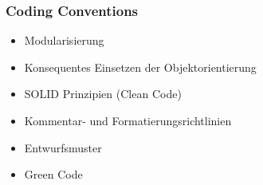 \begin{frame}
\frametitle{Coding Conventions}

\begin{itemize}
\item Modularisierung
\item Konsequentes Einsetzen der Objektorientierung
\item SOLID Prinzipien (Clean Code)
\item Kommentar- und Formatierungsrichtlinien
\item Entwurfsmuster
\item Green Code
\end{itemize}

\end{frame}




